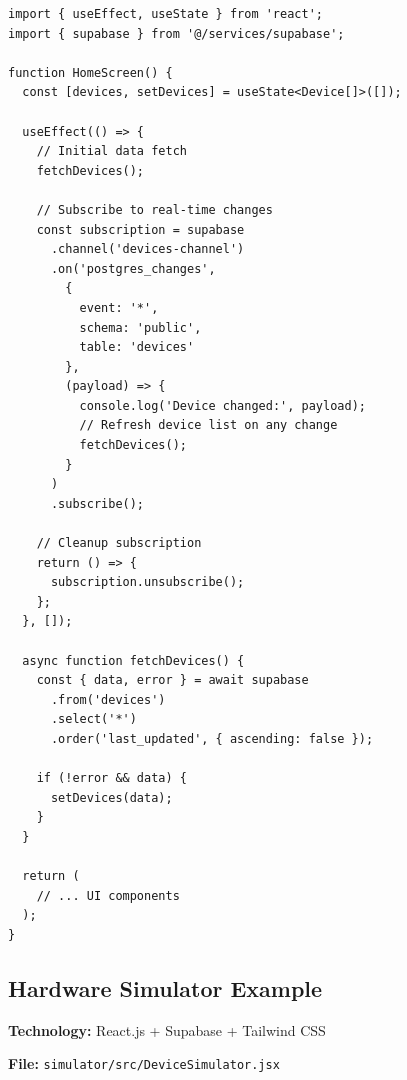 \documentclass[12pt,a4paper]{article}
\begin{document}
\begin{verbatim}
import { useEffect, useState } from 'react';
import { supabase } from '@/services/supabase';

function HomeScreen() {
  const [devices, setDevices] = useState<Device[]>([]);

  useEffect(() => {
    // Initial data fetch
    fetchDevices();

    // Subscribe to real-time changes
    const subscription = supabase
      .channel('devices-channel')
      .on('postgres_changes', 
        { 
          event: '*', 
          schema: 'public', 
          table: 'devices' 
        },
        (payload) => {
          console.log('Device changed:', payload);
          // Refresh device list on any change
          fetchDevices();
        }
      )
      .subscribe();

    // Cleanup subscription
    return () => {
      subscription.unsubscribe();
    };
  }, []);

  async function fetchDevices() {
    const { data, error } = await supabase
      .from('devices')
      .select('*')
      .order('last_updated', { ascending: false });
    
    if (!error && data) {
      setDevices(data);
    }
  }

  return (
    // ... UI components
  );
}
\end{verbatim}

\subsection{Hardware Simulator Example}

\textbf{Technology:} React.js + Supabase + Tailwind CSS

\textbf{File:} \texttt{simulator/src/DeviceSimulator.jsx}
\end{document}
